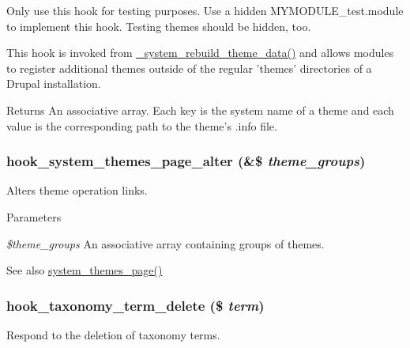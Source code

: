 Only use this hook for testing purposes. Use a hidden MYMODULE\_\-test.module to implement this hook. Testing themes should be hidden, too.

This hook is invoked from \hyperlink{system_8module_ac3eaa9c509c1446605136070ddbf5016}{\_\-system\_\-rebuild\_\-theme\_\-data()} and allows modules to register additional themes outside of the regular 'themes' directories of a Drupal installation.

\begin{DoxyReturn}{Returns}
An associative array. Each key is the system name of a theme and each value is the corresponding path to the theme's .info file. 
\end{DoxyReturn}
\hypertarget{group__hooks_ga710e94821a231299d36b2405008121d9}{
\subsubsection[{hook\_\-system\_\-themes\_\-page\_\-alter}]{\setlength{\rightskip}{0pt plus 5cm}hook\_\-system\_\-themes\_\-page\_\-alter (\&\$ {\em theme\_\-groups})}}
\label{group__hooks_ga710e94821a231299d36b2405008121d9}
Alters theme operation links.


\begin{DoxyParams}{Parameters}
\item[{\em \$theme\_\-groups}]An associative array containing groups of themes.\end{DoxyParams}
\begin{DoxySeeAlso}{See also}
\hyperlink{system_8admin_8inc_a4e0d7dd2d258e827cc3195b95151cd59}{system\_\-themes\_\-page()} 
\end{DoxySeeAlso}
\hypertarget{group__hooks_gab55fa1f290f3d43ea59795123154cf32}{
\subsubsection[{hook\_\-taxonomy\_\-term\_\-delete}]{\setlength{\rightskip}{0pt plus 5cm}hook\_\-taxonomy\_\-term\_\-delete (\$ {\em term})}}
\label{group__hooks_gab55fa1f290f3d43ea59795123154cf32}
Respond to the deletion of taxonomy terms.

